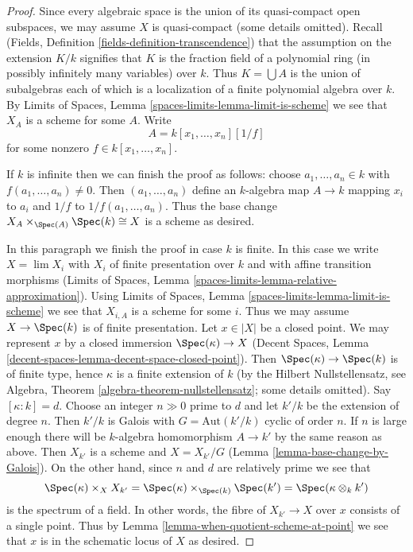 \begin{proof}
Since every algebraic space is the union of its quasi-compact open
subspaces, we may assume $X$ is quasi-compact (some details omitted).
Recall (Fields, Definition \ref{fields-definition-transcendence})
that the assumption on the extension $K/k$ signifies that
$K$ is the fraction field of a polynomial ring (in possibly infinitely
many variables) over $k$. Thus $K = \bigcup A$ is the union of subalgebras
each of which is a localization of a finite polynomial algebra over $k$.
By Limits of Spaces, Lemma \ref{spaces-limits-lemma-limit-is-scheme}
we see that $X_A$ is a scheme for some $A$. Write
$$
A = k[x_1, \ldots, x_n][1/f]
$$
for some nonzero $f \in k[x_1, \ldots, x_n]$.

\medskip\noindent
If $k$ is infinite then we can finish the proof as follows: choose
$a_1, \ldots, a_n \in k$ with $f(a_1, \ldots, a_n) \not = 0$.
Then $(a_1, \ldots, a_n)$ define an $k$-algebra map $A \to k$
mapping $x_i$ to $a_i$ and $1/f$ to $1/f(a_1, \ldots, a_n)$.
Thus the base change $X_A \times_{\Spec(A)} \Spec(k) \cong X$ is a
scheme as desired.

\medskip\noindent
In this paragraph we finish the proof in case $k$ is finite. In this
case we write $X = \lim X_i$ with $X_i$ of finite presentation over $k$
and with affine transition morphisms
(Limits of Spaces, Lemma \ref{spaces-limits-lemma-relative-approximation}).
Using Limits of Spaces, Lemma \ref{spaces-limits-lemma-limit-is-scheme}
we see that $X_{i, A}$ is a scheme for some $i$. Thus we may assume
$X \to \Spec(k)$ is of finite presentation. Let $x \in |X|$ be a closed
point. We may represent $x$ by a closed immersion
$\Spec(\kappa) \to X$
(Decent Spaces, Lemma \ref{decent-spaces-lemma-decent-space-closed-point}).
Then $\Spec(\kappa) \to \Spec(k)$ is of finite type, hence $\kappa$
is a finite extension of $k$ (by the Hilbert Nullstellensatz, see
Algebra, Theorem \ref{algebra-theorem-nullstellensatz};
some details omitted). Say $[\kappa : k] = d$. Choose an integer
$n \gg 0$ prime to $d$ and let $k'/k$ be the extension
of degree $n$. Then $k'/k$ is Galois with $G = \text{Aut}(k'/k)$
cyclic of order $n$. If $n$ is large enough there will be $k$-algebra
homomorphism $A \to k'$ by the same reason as above.
Then $X_{k'}$ is a scheme and $X = X_{k'}/G$
(Lemma \ref{lemma-base-change-by-Galois}).
On the other hand, since $n$ and $d$ are relatively prime we see that
$$
\Spec(\kappa) \times_{X} X_{k'} =
\Spec(\kappa) \times_{\Spec(k)} \Spec(k') =
\Spec(\kappa \otimes_k k')
$$
is the spectrum of a field. In other words, the fibre of $X_{k'} \to X$
over $x$ consists of a single point. Thus by
Lemma \ref{lemma-when-quotient-scheme-at-point}
we see that $x$ is in the schematic locus of $X$ as desired.
\end{proof}

